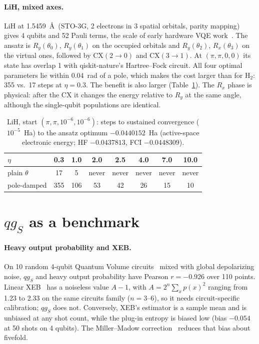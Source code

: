 \documentclass[11pt]{article}
\newcommand{\qgS}{qg_S}
\begin{document}
\paragraph{LiH, mixed axes.} LiH at 1.5459~\AA\ (STO-3G, 2 electrons in 3 spatial orbitals, parity
mapping) gives 4 qubits and 52 Pauli terms, the scale of early hardware VQE
work~\cite{omalley2016,kandala2017}. The ansatz is $R_y(\theta_0)$, $R_y(\theta_1)$ on the occupied
orbitals and $R_y(\theta_2)$, $R_x(\theta_3)$ on the virtual ones, followed by CX$(2\!\to\!0)$ and CX$(3\!\to\!1)$. At
$(\pi,\pi,0,0)$ its state has overlap 1 with qiskit-nature's Hartree--Fock circuit. All four
optimal parameters lie within 0.04~rad of a pole, which makes the cost larger than for H$_2$: 355
vs.\ 17 steps at $\eta=0.3$. The benefit is also larger (Table~\ref{tab:lih}). The $R_x$ phase is
physical: after the CX it changes the energy relative to $R_y$ at the same angle, although the
single-qubit populations are identical.

\begin{table}[t]
\centering\small
\caption{LiH, start $(\pi,\pi,10^{-6},10^{-6})$: steps to sustained convergence ($10^{-5}$~Ha) to the
ansatz optimum $-0.0440152$~Ha (active-space electronic energy; HF $-0.0437813$, FCI $-0.0448309$).}
\label{tab:lih}
\begin{tabular}{lccccccc}
\toprule
$\eta$ & 0.3 & 1.0 & 2.0 & 2.5 & 4.0 & 7.0 & 10.0\\
\midrule
plain $\theta$ & 17 & 5 & never & never & never & never & never\\
pole-damped & 355 & 106 & 53 & 42 & 26 & 15 & 10\\
\bottomrule
\end{tabular}
\end{table}

\section{\texorpdfstring{$\qgS$}{qgS} as a benchmark}\label{sec:bench}

\paragraph{Heavy output probability and XEB.} On 10 random 4-qubit Quantum Volume
circuits~\cite{cross2019} mixed with global depolarizing noise, $\qgS$ and heavy output probability
have Pearson $r=-0.926$ over 110 points. Linear XEB~\cite{arute2019} has a noiseless value $A-1$,
with $A=2^n\sum_xp(x)^2$ ranging from 1.23 to 2.33 on the same circuits family ($n=3$--6), so it needs
circuit-specific calibration; $\qgS$ does not. Conversely, XEB's estimator is a sample mean and
is unbiased at any shot count, while the plug-in entropy is biased low (bias $-0.054$ at 50 shots
on 4 qubits). The Miller--Madow correction~\cite{miller1955} reduces that bias about fivefold.
\end{document}
